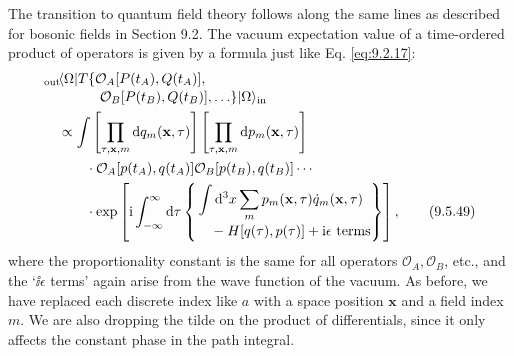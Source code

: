 The transition to quantum field theory follows along the same lines as
described for bosonic fields in Section 9.2. The vacuum expectation value of a
time-ordered product of operators is given by a formula just like Eq. \eqref{eq:9.2.17}:
\begin{align}
&{}_{\mathrm{out}}\!\langle \Omega\rvert T\{\mathcal{O}_A[P(t_A),Q(t_A)],
\notag\\[-2pt]
&\qquad\qquad\mathcal{O}_B[P(t_B),Q(t_B)],\ldots\}
 \lvert \Omega\rangle_{\mathrm{in}}
\notag\\
&\quad\propto\int
 \left[\prod_{\tau,\mathbf{x},m}\mathop{}\!\mathrm{d} q_m(\mathbf{x},\tau)\right]
 \left[\prod_{\tau,\mathbf{x},m}\mathop{}\!\mathrm{d} p_m(\mathbf{x},\tau)\right]
\notag\\
&\qquad\quad\cdot\mathcal{O}_A[p(t_A),q(t_A)]
 \mathcal{O}_B[p(t_B),q(t_B)]\cdots
\notag\\
&\qquad\quad\cdot\exp\left[\mathrm{i}\int_{-\infty}^{\infty}\mathop{}\!\mathrm{d}\tau
 \left\{\begin{aligned}
 &\int \mathop{}\!\mathrm{d}^3x\sum_mp_m(\mathbf{x},\tau)\dot q_m(\mathbf{x},\tau)\\[-2pt]
 &\quad{}-H[q(\tau),p(\tau)]+\mathrm{i}\epsilon\text{ terms}
 \end{aligned}\right\}\right],
\tag{9.5.49}\label{eq:9.5.49}
\end{align}
where the proportionality constant is the same for all operators
$\mathcal{O}_A,\mathcal{O}_B$, etc., and the `$\ii\epsilon$ terms' again arise
from the wave function of the vacuum. As before, we have replaced each
discrete index like $a$ with a space position $\mathbf{x}$ and a field index
$m$. We are also dropping the tilde on the product of differentials, since it
only affects the constant phase in the path integral.

